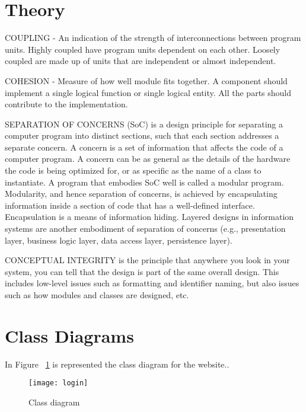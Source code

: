 \documentclass[12pt,a4paper,titlepage]{article}
\begin{document}
\section{Theory}

COUPLING - An indication of the strength of interconnections between program units.
Highly coupled have program units dependent on each other. Loosely coupled are made up of units that are independent or almost independent.\par

COHESION - Measure of how well module fits together.
A component should implement a single logical function or single logical entity. All the parts should contribute to the implementation.\par
SEPARATION OF CONCERNS (SoC) is a design principle for separating a computer program into distinct sections, such that each section addresses a separate concern. A concern is a set of information that affects the code of a computer program. A concern can be as general as the details of the hardware the code is being optimized for, or as specific as the name of a class to instantiate. A program that embodies SoC well is called a modular program. Modularity, and hence separation of concerns, is achieved by encapsulating information inside a section of code that has a well-defined interface. Encapsulation is a means of information hiding. Layered designs in information systems are another embodiment of separation of concerns (e.g., presentation layer, business logic layer, data access layer, persistence layer).\par

CONCEPTUAL INTEGRITY is the principle that anywhere you look in your system, you can tell that the design is part of the same overall design. This includes low-level issues such as formatting and identifier naming, but also issues such as how modules and classes are designed, etc.\par


\clearpage

\section{Class Diagrams}
In Figure ~\ref{fig:class} is represented the class diagram for the website..
\begin{figure}[H]
	\texttt{[image: login]}
	\caption{Class diagram}
	\centering
	\label{fig:class}
\end{figure}
\end{document}
